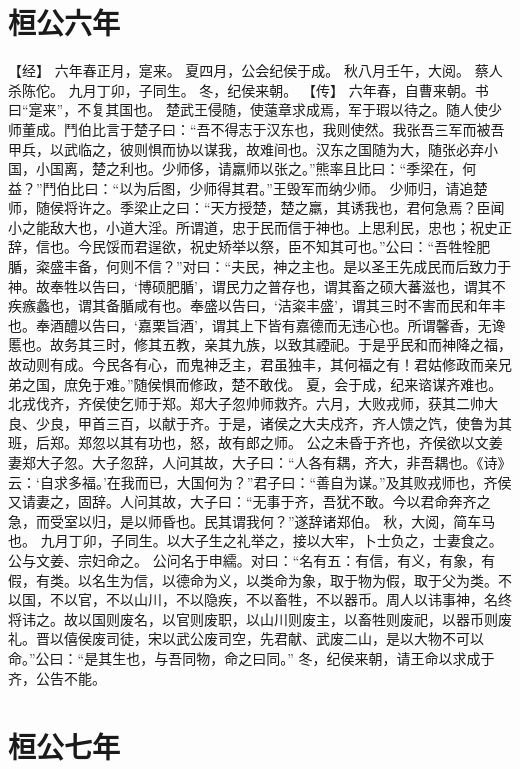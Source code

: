 \documentclass[a4paper,12pt,UTF8,twoside]{ctexbook}
\begin{document}
\section{桓公六年}

【经】
六年春正月，寔来。
夏四月，公会纪侯于成。
秋八月壬午，大阅。
蔡人杀陈佗。
九月丁卯，子同生。
冬，纪侯来朝。
【传】
六年春，自曹来朝。书曰“寔来”，不复其国也。
楚武王侵随，使薳章求成焉，军于瑕以待之。随人使少师董成。鬥伯比言于楚子曰：“吾不得志于汉东也，我则使然。我张吾三军而被吾甲兵，以武临之，彼则惧而协以谋我，故难间也。汉东之国随为大，随张必弃小国，小国离，楚之利也。少师侈，请羸师以张之。”熊率且比曰：“季梁在，何益？”鬥伯比曰：“以为后图，少师得其君。”王毁军而纳少师。
少师归，请追楚师，随侯将许之。季梁止之曰：“天方授楚，楚之羸，其诱我也，君何急焉？臣闻小之能敌大也，小道大淫。所谓道，忠于民而信于神也。上思利民，忠也；祝史正辞，信也。今民馁而君逞欲，祝史矫举以祭，臣不知其可也。”公曰：“吾牲牷肥腯，粢盛丰备，何则不信？”对曰：“夫民，神之主也。是以圣王先成民而后致力于神。故奉牲以告曰，‘博硕肥腯’，谓民力之普存也，谓其畜之硕大蕃滋也，谓其不疾瘯蠡也，谓其备腯咸有也。奉盛以告曰，‘洁粢丰盛’，谓其三时不害而民和年丰也。奉酒醴以告曰，‘嘉栗旨酒’，谓其上下皆有嘉德而无违心也。所谓馨香，无谗慝也。故务其三时，修其五教，亲其九族，以致其禋祀。于是乎民和而神降之福，故动则有成。今民各有心，而鬼神乏主，君虽独丰，其何福之有！君姑修政而亲兄弟之国，庶免于难。”随侯惧而修政，楚不敢伐。
夏，会于成，纪来谘谋齐难也。
北戎伐齐，齐侯使乞师于郑。郑大子忽帅师救齐。六月，大败戎师，获其二帅大良、少良，甲首三百，以献于齐。于是，诸侯之大夫戍齐，齐人馈之饩，使鲁为其班，后郑。郑忽以其有功也，怒，故有郎之师。
公之未昏于齐也，齐侯欲以文姜妻郑大子忽。大子忽辞，人问其故，大子曰：“人各有耦，齐大，非吾耦也。《诗》云：‘自求多福。’在我而已，大国何为？”君子曰：“善自为谋。”及其败戎师也，齐侯又请妻之，固辞。人问其故，大子曰：“无事于齐，吾犹不敢。今以君命奔齐之急，而受室以归，是以师昏也。民其谓我何？”遂辞诸郑伯。
秋，大阅，简车马也。
九月丁卯，子同生。以大子生之礼举之，接以大牢，卜士负之，士妻食之。公与文姜、宗妇命之。
公问名于申繻。对曰：“名有五：有信，有义，有象，有假，有类。以名生为信，以德命为义，以类命为象，取于物为假，取于父为类。不以国，不以官，不以山川，不以隐疾，不以畜牲，不以器币。周人以讳事神，名终将讳之。故以国则废名，以官则废职，以山川则废主，以畜牲则废祀，以器币则废礼。晋以僖侯废司徒，宋以武公废司空，先君献、武废二山，是以大物不可以命。”公曰：“是其生也，与吾同物，命之曰同。”
冬，纪侯来朝，请王命以求成于齐，公告不能。

\section{桓公七年}
\end{document}
